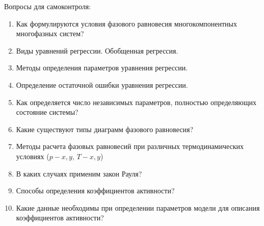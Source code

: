 Вопросы для самоконтроля:
\begin{enumerate}
	\item Как формулируются условия фазового равновесия многокомпонентных многофазных систем?
	\item Виды уравнений регрессии. Обобщенная регрессия.
	\item Методы определения параметров уравнения регрессии.
	\item Определение остаточной ошибки уравнения регрессии.
	\item Как определяется число независимых параметров, полностью определяющих состояние системы?
	\item Какие существуют типы диаграмм фазового равновесия?
	\item Методы расчета фазовых равновесий при различных термодинамических условиях ($p-x,y$,  $T-x,y$)
	\item В каких случаях применим закон Рауля?
	\item Способы определения коэффициентов активности?
	\item Какие данные необходимы при определении параметров модели для описания коэффициентов активности?
\end{enumerate}